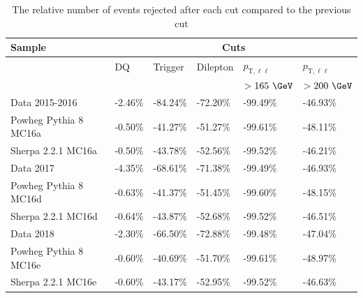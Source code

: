 \begin{table}[h!]
  \centering
  \begin{tabular}{l|l|l|l|l|l}
  \hline\hline
  \textbf{Sample} & \multicolumn{5}{c}{\textbf{Cuts}} \\ \hline
    & DQ & Trigger & Dilepton & $p_{\text{T},\ell\ell}$ & $p_{\text{T},\ell\ell}$ \\
    &  &  &  & $>165~\GeV$ & $>200~\GeV$ \\ \hline\hline
   Data 2015-2016 & -2.46\% & -84.24\% & -72.20\% & -99.49\% & -46.93\% \\ \hline
   Powheg Pythia 8 MC16a & -0.50\% & -41.27\% & -51.27\% & -99.61\% & -48.11\% \\ \hline
   Sherpa 2.2.1 MC16a & -0.50\% & -43.78\% & -52.56\% & -99.52\% & -46.21\% \\ \hline\hline
   Data 2017 & -4.35\% & -68.61\% & -71.38\% & -99.49\% & -46.93\% \\ \hline
   Powheg Pythia 8 MC16d & -0.63\% & -41.37\% & -51.45\% & -99.60\% & -48.15\% \\ \hline
   Sherpa 2.2.1 MC16d & -0.64\% & -43.87\% & -52.68\% & -99.52\% & -46.51\% \\ \hline\hline
   Data 2018 & -2.30\% & -66.50\% & -72.88\% & -99.48\% & -47.04\% \\ \hline
   Powheg Pythia 8 MC16e & -0.60\% & -40.69\% & -51.70\% & -99.61\% & -48.97\% \\ \hline
   Sherpa 2.2.1 MC16e & -0.60\% & -43.17\% & -52.95\% & -99.52\% & -46.63\% \\ \hline\hline
   \end{tabular}
   \caption{The relative number of events rejected after each cut compared to the previous cut}
   \label{tab:RelCF}
\end{table}

